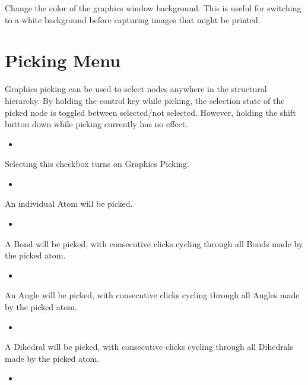 \documentclass[letterpaper,11pt,english]{sphinxmanual}
\begin{document}
\sphinxAtStartPar
Change the color of the graphics window background. This is useful for switching to a white background before capturing images that might be printed.


\section{Picking Menu}
\label{\detokenize{text/menus:picking-menu}}
\sphinxAtStartPar
Graphics picking can be used to select nodes anywhere in the structural hierarchy. By holding the control key while picking, the selection state of the picked node is toggled between selected/not selected. However, holding the shift button down while picking currently has no effect.
\begin{itemize}
\item {} 
\sphinxAtStartPar
{}

\end{itemize}

\sphinxAtStartPar
Selecting this checkbox turns on Graphics Picking.
\begin{itemize}
\item {} 
\sphinxAtStartPar
{}

\end{itemize}

\sphinxAtStartPar
An individual Atom will be picked.
\begin{itemize}
\item {} 
\sphinxAtStartPar
{}

\end{itemize}

\sphinxAtStartPar
A Bond will be picked, with consecutive clicks cycling through all Bonds made by the picked atom.
\begin{itemize}
\item {} 
\sphinxAtStartPar
{}

\end{itemize}

\sphinxAtStartPar
An Angle will be picked, with consecutive clicks cycling through all Angles made by the picked atom.
\begin{itemize}
\item {} 
\sphinxAtStartPar
{}

\end{itemize}

\sphinxAtStartPar
A Dihedral will be picked, with consecutive clicks cycling through all Dihedrals made by the picked atom.
\begin{itemize}
\item {} 
\sphinxAtStartPar
{}

\end{itemize}
\end{document}
